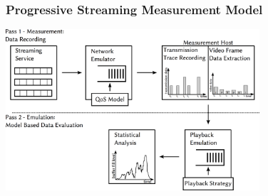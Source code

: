 \documentclass{beamer}
\begin{document}
\begin{frame}
	\frametitle{Progressive Streaming Measurement Model}

	\begin{center}
		\includegraphics[height=6cm]{extras/measurement-model.png}
	\end{center}




\end{frame}





\end{document}
